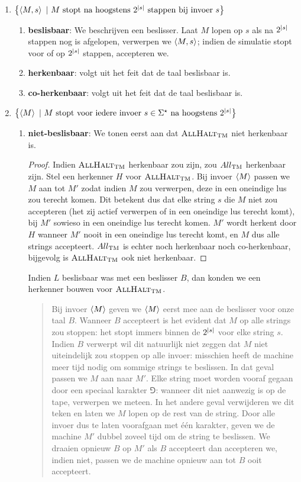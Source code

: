 \documentclass{article}
\begin{document}
\begin{question}[Berekenbaarheid]
\begin{answer}
\begin{enumerate}
\begin{enumerate}
 \end{enumerate}
 \item $\left\{ \left\langle M,s \right\rangle\ |\ \mbox{$M$ stopt na hoogstens $2^{\left|s\right|}$ stappen bij invoer $s$} \right\}$
 \begin{enumerate}
  \item \textbf{beslisbaar}: We beschrijven een beslisser. Laat $M$ lopen op $s$ als na $2^{\left|s\right|}$ stappen nog is afgelopen, verwerpen we $\left\langle M,s \right\rangle$; indien de simulatie stopt voor of op $2^{\left|s\right|}$ stappen, accepteren we.
  \item \textbf{herkenbaar}: volgt uit het feit dat de taal beslisbaar is.
  \item \textbf{co-herkenbaar}: volgt uit het feit dat de taal beslisbaar is.
 \end{enumerate}
 \item $\left\{ \left\langle M \right\rangle\ |\ \mbox{$M$ stopt voor iedere invoer $s\in\Sigma^{\star}$ na hoogstens $2^{\left|s\right|}$} \right\}$
 \begin{enumerate}
  \item \textbf{niet-beslisbaar}: We tonen eerst aan dat $\mbox{\sc AllHalt}_{\rm TM}$ niet herkenbaar is.
  \begin{proof}
  Indien $\mbox{\sc AllHalt}_{\rm TM}$ herkenbaar zou zijn, zou ${\sc All}_{\rm TM}$ herkenbaar zijn. Stel een herkenner $H$ voor $\mbox{\sc AllHalt}_{\rm TM}$. Bij invoer $\left\langle M \right\rangle$ passen we $M$ aan tot $M'$ zodat indien $M$ zou verwerpen, deze in een oneindige lus zou terecht komen. Dit betekent dus dat elke string $s$ die $M$ niet zou accepteren (het zij actief verwerpen of in een oneindige lus terecht komt), bij $M'$ sowieso in een oneindige lus terecht komen. $M'$ wordt herkent door $H$ wanneer $M'$ nooit in een oneindige lus terecht komt, en $M$ dus alle strings accepteert. ${\sc All}_{\rm TM}$ is echter noch herkenbaar noch co-herkenbaar, bijgevolg is $\mbox{\sc AllHalt}_{\rm TM}$ ook niet herkenbaar.
  \end{proof}
  Indien $L$ beslisbaar was met een beslisser $B$, dan konden we een herkenner bouwen voor $\mbox{\sc AllHalt}_{\rm TM}$.
  \begin{quote}
   Bij invoer $\left\langle M \right\rangle$ geven we $\left\langle M \right\rangle$ eerst mee aan de beslisser voor onze taal $B$. Wanneer $B$ accepteert is het evident dat $M$ op alle strings zou stoppen: het stopt immers binnen de $2^{\left|s\right|}$ voor elke string $s$. Indien $B$ verwerpt wil dit natuurlijk niet zeggen dat $M$ niet uiteindelijk zou stoppen op alle invoer: misschien heeft de machine meer tijd nodig om sommige strings te beslissen. In dat geval passen we $M$ aan naar $M'$. Elke string moet worden vooraf gegaan door een speciaal karakter $\Game$: wanneer dit niet aanwezig is op de tape, verwerpen we meteen. In het andere geval verwijderen we dit teken en laten we $M$ lopen op de rest van de string. Door alle invoer dus te laten voorafgaan met \'e\'en karakter, geven we de machine $M'$ dubbel zoveel tijd om de string te beslissen. We draaien opnieuw $B$ op $M'$ als $B$ accepteert dan accepteren we, indien niet, passen we de machine opnieuw aan tot $B$ ooit accepteert.

\end{quote}
\end{enumerate}
\end{enumerate}
\end{answer}
\end{question}
\end{document}
